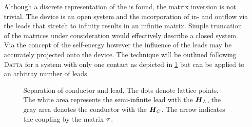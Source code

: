Although a discrete representation of the \hamil{} is found, the matrix inversion is not trivial. The device is an open system and the incorporation of in- and outflow via the leads that stretch to infinity results in an infinite matrix.
Simple truncation of the matrices under consideration would effectively describe a closed system. Via the concept of the self-energy however the influence of the leads may be accurately projected onto the device.
The technique will be outlined following \textsc{Datta} for a system with only one contact as depicted in \cref{fig:selfenergy} but can be applied to an arbitray number of leads. \begin{figure}[h!]
\centering
{}
\caption{Separation of conductor and lead. The dots denote lattice points. The white area represents the semi-infinite lead with the \hamil{} $\boldsymbol{H}_L$, the gray area denotes the conductor with the \hamil{} $\boldsymbol{H}_C$. The arrow indicates the coupling by the matrix $\boldsymbol{\tau}$.}
\label{fig:selfenergy}
\end{figure}
